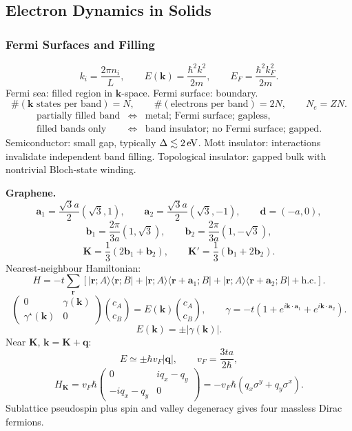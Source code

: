 \subsection{Electron Dynamics in Solids}

\subsubsection*{Fermi Surfaces and Filling}

\[
k_i=\frac{2\pi n_i}{L},\qquad
E(\mathbf k)=\frac{\hbar^2k^2}{2m},\qquad
E_F=\frac{\hbar^2k_F^2}{2m}.
\]
Fermi sea: filled region in $\mathbf k$-space. Fermi surface: boundary.
\[
\#(\mathbf k\text{ states per band})=N,\qquad
\#(\text{electrons per band})=2N,\qquad
N_e=ZN.
\]
\[
\boxed{
\begin{array}{ccl}
\text{partially filled band}&\Longleftrightarrow&\text{metal; Fermi surface; gapless},\\
\text{filled bands only}&\Longleftrightarrow&\text{band insulator; no Fermi surface; gapped}.
\end{array}}
\]
Semiconductor: small gap, typically $\Delta\lesssim2\,{\rm eV}$. Mott insulator:
interactions invalidate independent band filling. Topological insulator: gapped bulk
with nontrivial Bloch-state winding. 

\noindent\textbf{Graphene.}
\[
\mathbf a_1=\frac{\sqrt3a}{2}(\sqrt3,1),\qquad
\mathbf a_2=\frac{\sqrt3a}{2}(\sqrt3,-1),\qquad
\mathbf d=(-a,0),
\]
\[
\mathbf b_1=\frac{2\pi}{3a}(1,\sqrt3),\qquad
\mathbf b_2=\frac{2\pi}{3a}(1,-\sqrt3),
\]
\[
\mathbf K=\frac13(2\mathbf b_1+\mathbf b_2),\qquad
\mathbf K'=\frac13(\mathbf b_1+2\mathbf b_2).
\]
Nearest-neighbour Hamiltonian:
\[
H=-t\sum_{\mathbf r}\left[
|\mathbf r;A\rangle\langle\mathbf r;B|
+|\mathbf r;A\rangle\langle\mathbf r+\mathbf a_1;B|
+|\mathbf r;A\rangle\langle\mathbf r+\mathbf a_2;B|+\mathrm{h.c.}\right].
\]
\[
\begin{pmatrix}0&\gamma(\mathbf k)\\\gamma^\star(\mathbf k)&0\end{pmatrix}
\binom{c_A}{c_B}=E(\mathbf k)\binom{c_A}{c_B},
\qquad
\gamma=-t(1+e^{i\mathbf k\cdot\mathbf a_1}+e^{i\mathbf k\cdot\mathbf a_2}).
\]
\[
\boxed{E(\mathbf k)=\pm|\gamma(\mathbf k)|}.
\]
Near $\mathbf K$, $\mathbf k=\mathbf K+\mathbf q$:
\[
E\simeq\pm\hbar v_F|\mathbf q|,\qquad v_F=\frac{3ta}{2\hbar},
\]
\[
H_{\mathbf K}=v_F\hbar
\begin{pmatrix}0&iq_x-q_y\\-iq_x-q_y&0\end{pmatrix}
=-v_F\hbar(q_x\sigma^y+q_y\sigma^x).
\]
Sublattice pseudospin plus spin and valley degeneracy gives four massless Dirac
fermions. 

